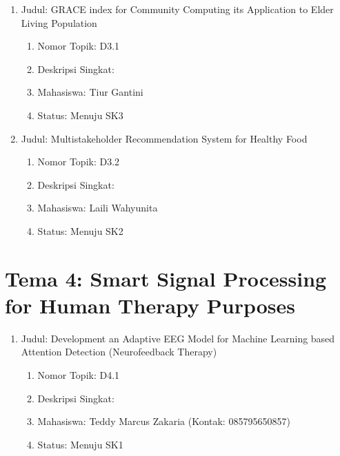 \documentclass[
  letterpaper,
  DIV=11,
  numbers=noendperiod]{scrreprt}
\providecommand{\tightlist}{%
  \setlength{\itemsep}{0pt}\setlength{\parskip}{0pt}}
\begin{document}
\begin{enumerate}
\def\labelenumi{\arabic{enumi}.}
\tightlist
\item
  Judul: GRACE index for Community Computing its Application to Elder
  Living Population

  \begin{enumerate}
  \def\labelenumii{\arabic{enumii}.}
  \tightlist
  \item
    Nomor Topik: D3.1
  \item
    Deskripsi Singkat:
  \item
    Mahasiswa: Tiur Gantini
  \item
    Status: Menuju SK3
  \end{enumerate}
\item
  Judul: Multistakeholder Recommendation System for Healthy Food

  \begin{enumerate}
  \def\labelenumii{\arabic{enumii}.}
  \tightlist
  \item
    Nomor Topik: D3.2
  \item
    Deskripsi Singkat:
  \item
    Mahasiswa: Laili Wahyunita
  \item
    Status: Menuju SK2
  \end{enumerate}
\end{enumerate}

\section{Tema 4: Smart Signal Processing for Human Therapy
Purposes}\label{tema-4-smart-signal-processing-for-human-therapy-purposes}

\begin{enumerate}
\def\labelenumi{\arabic{enumi}.}
\tightlist
\item
  Judul: Development an Adaptive EEG Model for Machine Learning based
  Attention Detection (Neurofeedback Therapy)

  \begin{enumerate}
  \def\labelenumii{\arabic{enumii}.}
  \tightlist
  \item
    Nomor Topik: D4.1
  \item
    Deskripsi Singkat:
  \item
    Mahasiswa: Teddy Marcus Zakaria (Kontak: 085795650857)
  \item
    Status: Menuju SK1
  \end{enumerate}
\end{enumerate}
\end{document}
